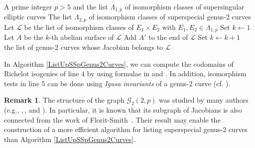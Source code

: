 \documentclass{amsart}
\theoremstyle{definition}
\newtheorem{Rmk}[Def]{Remark}
\theoremstyle{plain}
\begin{document}
\begin{algorithm}[htbp]
\begin{algorithmic}[1]
\caption{{\sf ListSspGenus2Curves}}\label{ListUpSSpGenus2Curves}
\renewcommand{\algorithmicrequire}{\textbf{Input:}}
\renewcommand{\algorithmicensure}{\textbf{Output:}}
\Require A prime integer $p > 5$ and the list $\Lambda_{1,p}$ of isomorphism classes of supersingular elliptic curves
\Ensure The list $\Lambda_{2,p}$ of isomorphism classes of superspecial genus-2 curves
\State Let $\mathcal{L}$ be the list of isomorphism classes of $E_1 \times E_2$ with $E_1,E_2 \in \Lambda_{1,p}$
\State Set $k \leftarrow 1$
\Repeat
\State Let $A$ be the $k$-th abelian surface of $\mathcal{L}$
\State Add $A'$ to the end of $\mathcal{L}$
\EndIf
\EndFor
\State Set $k \leftarrow k+1$
\\
\Return the list of genus-2 curves whose Jacobian belongs to $\mathcal{L}$
\end{algorithmic}
\end{algorithm}\vspace{-0.7mm}

\noindent In Algorithm \ref{ListUpSSpGenus2Curves}, we can compute the codomains of Richelot isogenies of line 4 by using formulae in \cite[Proposition 4]{HLP} and \cite[Chapter 8]{Smith}.
In addition, isomorphism tests in line 5 can be done using \emph{Igusa invariants} of a genus-2 curve (cf. \cite{Igusa-inv}).\vspace{-0.5mm}
\begin{Rmk}
The structure of the graph $\mathcal{G}_2(2,p)$ was studied by many authors ({e.g., \cite{CDS},\,\cite{KT}, and \cite{FS2}}).
In particular, it is known that its subgraph of Jacobians is also connected from the {work of Florit-Smith}~\cite[Theorem 7.2]{FS1}.
Their result may enable the construction of a more efficient algorithm for listing superspecial genus-2 curves {than} Algorithm \ref{ListUpSSpGenus2Curves}.
\end{Rmk}
\end{document}

